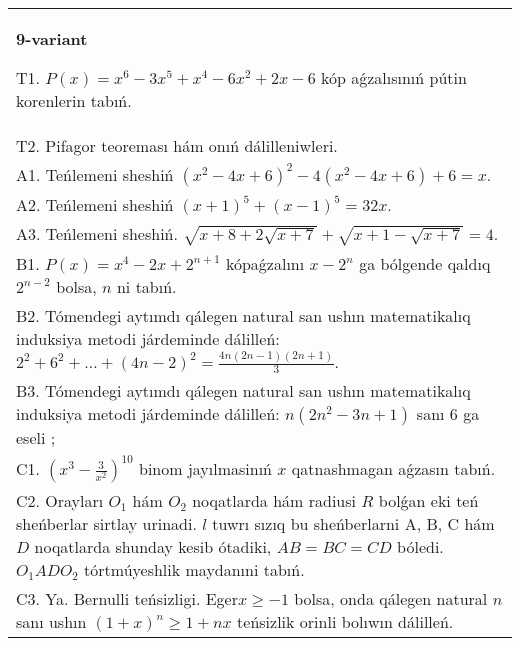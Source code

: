 \documentclass{article}
\begin{document}
\begin{tabular}{m{17cm}}
\textbf{9-variant}
\newline

T1. \(P(x) = x^{6} - 3x^{5} + x^{4} - 6x^{2} + 2x - 6\) kóp aǵzalısınıń pútin korenlerin tabıń. \\
T2. Pifagor teoreması hám onıń dálilleniwleri. \\
A1. Teńlemeni sheshiń \(\left( x^{2} - 4x + 6 \right)^{2} - 4\left( x^{2} - 4x + 6 \right) + 6 = x\). \\
A2. Teńlemeni sheshiń \((x + 1)^{5} + (x - 1)^{5} = 32x\). \\
A3. Teńlemeni sheshiń. \(\sqrt{x + 8 + 2\sqrt{x + 7}} + \sqrt{x + 1 - \sqrt{x + 7}} = 4\). \\
B1. \(P(x) = x^{4} - 2x + 2^{n + 1}\) kópaǵzalını \(x - 2^{n}\) ga bólgende qaldıq \(2^{n - 2}\) bolsa, \(n\) ni tabıń. \\
B2. Tómendegi aytımdı qálegen natural san ushın matematikalıq induksiya metodi járdeminde dálilleń: \(2^{2} + 6^{2} + \ldots + (4n - 2)^{2} = \frac{4n(2n - 1)(2n + 1)}{3}\). \\
B3. Tómendegi aytımdı qálegen natural san ushın matematikalıq induksiya metodi járdeminde dálilleń: \(n\left( 2n^{2} - 3n + 1 \right)\) sanı 6 ga eseli ; \\
C1. \(\left( x^{3} - \frac{3}{x^{2}} \right)^{10}\) binom jayılmasinıń \(x\) qatnashmagan aǵzasın tabıń. \\
C2. Orayları \(O_{1}\) hám \(O_{2}\) noqatlarda hám radiusi \(R\) bolǵan eki teń sheńberlar sirtlay urinadi. \(l\) tuwrı sızıq bu sheńberlarni A, B, C hám \(D\) noqatlarda shunday kesib ótadiki, \(AB = BC = CD\) bóledi. \(O_{1}ADO_{2}\) tórtmúyeshlik maydanıni tabıń. \\
C3. Ya. Bernulli teńsizligi. Eger\(x \geq - 1\) bolsa, onda qálegen natural \(n\) sanı ushın \((1 + x)^{n} \geq 1 + nx\) teńsizlik orinli bolıwın dálilleń. \\

\end{tabular}
\vspace{1cm}
\end{document}
